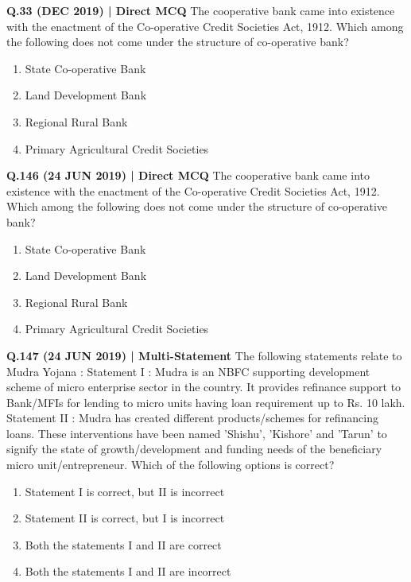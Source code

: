 \documentclass{article}
\begin{document}
\textbf{Q.33 (DEC 2019) | Direct MCQ}
The cooperative bank came into existence with the enactment of the Co-operative Credit Societies Act, 1912. Which among the following does not come under the structure of co-operative bank?
\begin{enumerate}[label=(\arabic*)]
    \item State Co-operative Bank
    \item Land Development Bank
    \item Regional Rural Bank
    \item Primary Agricultural Credit Societies
\end{enumerate}

\textbf{Q.146 (24 JUN 2019) | Direct MCQ}
The cooperative bank came into existence with the enactment of the Co-operative Credit Societies Act, 1912. Which among the following does not come under the structure of co-operative bank?
\begin{enumerate}[label=(\arabic*)]
    \item State Co-operative Bank
    \item Land Development Bank
    \item Regional Rural Bank
    \item Primary Agricultural Credit Societies
\end{enumerate}

\textbf{Q.147 (24 JUN 2019) | Multi-Statement}
The following statements relate to Mudra Yojana :
Statement I : Mudra is an NBFC supporting development scheme of micro enterprise sector in the country. It provides refinance support to Bank/MFIs for lending to micro units having loan requirement up to Rs. 10 lakh.
Statement II : Mudra has created different products/schemes for refinancing loans. These interventions have been named 'Shishu', 'Kishore' and 'Tarun' to signify the state of growth/development and funding needs of the beneficiary micro unit/entrepreneur.
Which of the following options is correct?
\begin{enumerate}[label=(\arabic*)]
    \item Statement I is correct, but II is incorrect
    \item Statement II is correct, but I is incorrect
    \item Both the statements I and II are correct
    \item Both the statements I and II are incorrect
\end{enumerate}
\end{document}
